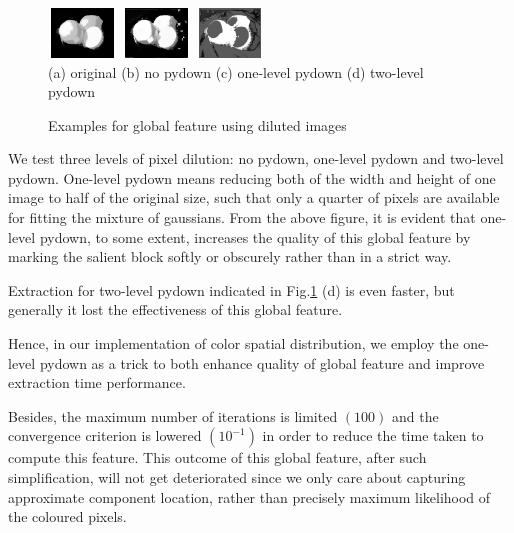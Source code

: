 \documentclass[10pt,twocolumn,letterpaper]{article}
\begin{document}
\begin{figure}[h]
\begin{center}
    \includegraphics[width=0.72in,height=0.52in]{./Figures/pydownCompare/3NOPYDOWN.jpg}
    \includegraphics[width=0.72in,height=0.52in]{./Figures/pydownCompare/3PYDOWN.jpg} 
    \includegraphics[width=0.72in,height=0.52in]{./Figures/pydownCompare/3DOUBLEPYDOWN.jpg} \\
    \footnotesize (a) original (b) no pydown (c) one-level pydown (d) two-level pydown
    \caption{Examples for global feature using diluted images} \label{Fig:GlobalPydown}
    \end{center}
\end{figure}

We test three levels of pixel dilution: no pydown, one-level pydown and two-level pydown. 
One-level pydown means reducing both of the width and height of one image to half of the 
original size,  such that only a quarter of pixels are available for fitting the mixture 
of gaussians. From the above figure, it is evident that one-level pydown, to some extent, 
increases the quality of  this global feature by marking the salient block softly or 
obscurely rather than in a strict way. 

Extraction for two-level pydown indicated in Fig.\ref{Fig:GlobalPydown} (d) is even faster, but generally 
it lost the effectiveness of this global feature.

Hence, in our implementation of color spatial distribution, we employ the one-level 
pydown as a trick to both enhance quality of global feature and improve extraction time performance.

Besides, the maximum number of iterations is limited $(100)$ and the convergence criterion 
is lowered $(10^{-1})$ in order to reduce the time taken to compute this feature.  This 
outcome of this global feature, after such simplification, will not get deteriorated 
since we only care about capturing  approximate component location, rather than precisely
maximum likelihood of the coloured pixels.
\end{document}
